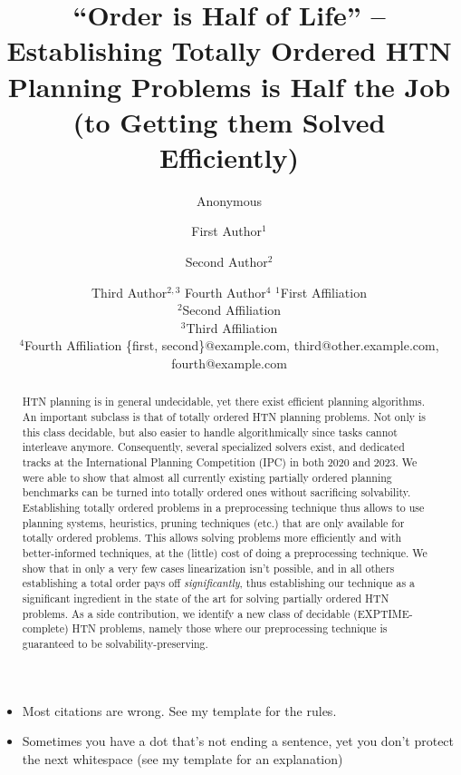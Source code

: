 \documentclass{article}
\title{``Order is Half of Life'' -- Establishing Totally Ordered HTN Planning Problems is Half the Job (to Getting them Solved Efficiently)}
\author{Anonymous}
\author{
	First Author$^1$
	\and
	Second Author$^2$\and
	Third Author$^{2,3}$\And
	Fourth Author$^4$
	\affiliations
	$^1$First Affiliation\\
	$^2$Second Affiliation\\
	$^3$Third Affiliation\\
	$^4$Fourth Affiliation
	\emails
	\{first, second\}@example.com,
	third@other.example.com,
	fourth@example.com
}
\begin{document}
	
	\maketitle
	
	\begin{abstract}
		HTN planning is in general undecidable, yet there exist efficient planning algorithms. An important subclass is that of totally ordered HTN planning problems. Not only is this class decidable, but also easier to handle algorithmically since tasks cannot interleave anymore. Consequently, several specialized solvers exist, and dedicated tracks at the International Planning Competition (IPC) in both 2020 and 2023. We were able to show that almost all currently existing partially ordered planning benchmarks can be turned into totally ordered ones without sacrificing solvability. Establishing totally ordered problems in a preprocessing technique thus allows to use planning systems, heuristics, pruning techniques (etc.) that are only available for totally ordered problems. This allows solving problems more efficiently and with better-informed techniques, at the (little) cost of doing a preprocessing technique. We show that in only a very few cases linearization isn't possible, and in all others establishing a total order pays off \emph{significantly}, thus establishing our technique as a significant ingredient in the state of the art for solving partially ordered HTN problems. As a side contribution, we identify a new class of decidable (EXPTIME-complete) HTN problems, namely those where our preprocessing technique is guaranteed to be solvability-preserving.
	\end{abstract}
	
	
	
	
	
	\begin{itemize}
		\item Most citations are wrong. See my template for the rules.
		\item Sometimes you have a dot that's not ending a sentence, yet you don't protect the next whitespace (see my template for an explanation)
	\end{itemize}
	
\end{document}
